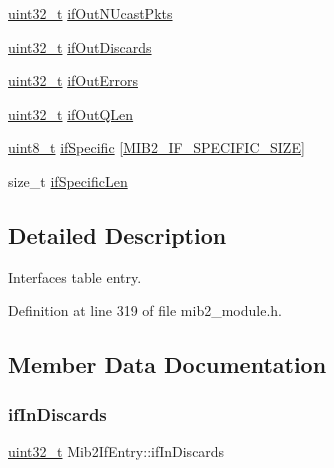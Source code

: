 \begin{DoxyCompactItemize}
\item 
\hyperlink{stdint_8h_a435d1572bf3f880d55459d9805097f62}{uint32\+\_\+t} \hyperlink{structMib2IfEntry_a9105a34d2408a19ff684937050aa5244}{if\+Out\+N\+Ucast\+Pkts}
\item 
\hyperlink{stdint_8h_a435d1572bf3f880d55459d9805097f62}{uint32\+\_\+t} \hyperlink{structMib2IfEntry_a5deaaa7d6c3bb1aba481f05d5726311d}{if\+Out\+Discards}
\item 
\hyperlink{stdint_8h_a435d1572bf3f880d55459d9805097f62}{uint32\+\_\+t} \hyperlink{structMib2IfEntry_a79566db7823f36b16e3b5c36bb3a098a}{if\+Out\+Errors}
\item 
\hyperlink{stdint_8h_a435d1572bf3f880d55459d9805097f62}{uint32\+\_\+t} \hyperlink{structMib2IfEntry_af576c2848418600878027808b4f31361}{if\+Out\+Q\+Len}
\item 
\hyperlink{stdint_8h_aba7bc1797add20fe3efdf37ced1182c5}{uint8\+\_\+t} \hyperlink{structMib2IfEntry_a5f7f368817a3bde57acc18d8db1f502a}{if\+Specific} \mbox{[}\hyperlink{mib2__module_8h_af5a14fedbc2e2ee637df5608cdd8527e}{M\+I\+B2\+\_\+\+I\+F\+\_\+\+S\+P\+E\+C\+I\+F\+I\+C\+\_\+\+S\+I\+ZE}\mbox{]}
\item 
size\+\_\+t \hyperlink{structMib2IfEntry_aceb84584422b78ac60b727b31c24f27f}{if\+Specific\+Len}
\end{DoxyCompactItemize}


\subsection{Detailed Description}
Interfaces table entry. 

Definition at line 319 of file mib2\+\_\+module.\+h.



\subsection{Member Data Documentation}
\mbox{\label{structMib2IfEntry_ae278c92618145fa46b3af6e762f4149b}} 
\subsubsection{\texorpdfstring{if\+In\+Discards}{ifInDiscards}}
{\footnotesize\ttfamily \hyperlink{stdint_8h_a435d1572bf3f880d55459d9805097f62}{uint32\+\_\+t} Mib2\+If\+Entry\+::if\+In\+Discards}



